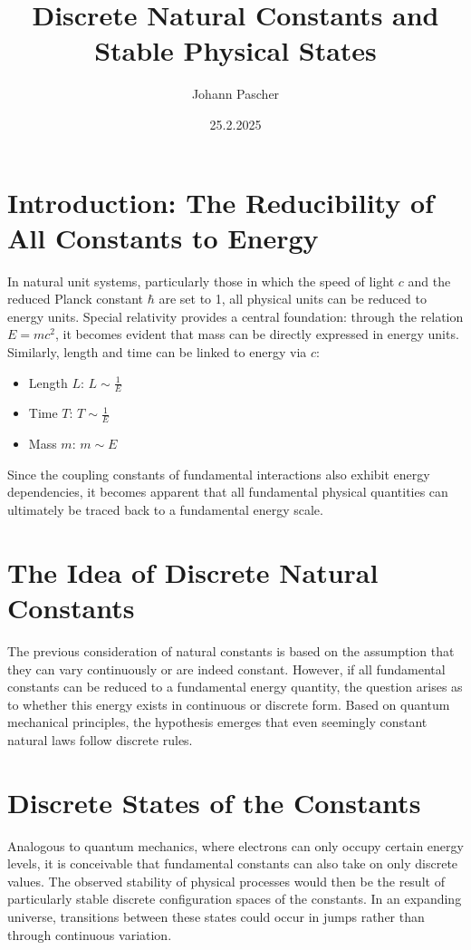 \documentclass{article}
\title{Discrete Natural Constants and Stable Physical States}
\author{Johann Pascher}
\date{25.2.2025}
\begin{document}
	
	\maketitle
	\tableofcontents
	\section{Introduction: The Reducibility of All Constants to Energy}
	
	In natural unit systems, particularly those in which the speed of light \( c \) and the reduced Planck constant \( \hbar \) are set to 1, all physical units can be reduced to energy units. Special relativity provides a central foundation: through the relation \( E = mc^2 \), it becomes evident that mass can be directly expressed in energy units. Similarly, length and time can be linked to energy via \( c \):
	
	\begin{itemize}
		\item Length \( L \): \( L \sim \frac{1}{E} \)
		\item Time \( T \): \( T \sim \frac{1}{E} \)
		\item Mass \( m \): \( m \sim E \)
	\end{itemize}
	
	Since the coupling constants of fundamental interactions also exhibit energy dependencies, it becomes apparent that all fundamental physical quantities can ultimately be traced back to a fundamental energy scale.
	
	\section{The Idea of Discrete Natural Constants}
	
	The previous consideration of natural constants is based on the assumption that they can vary continuously or are indeed constant. However, if all fundamental constants can be reduced to a fundamental energy quantity, the question arises as to whether this energy exists in continuous or discrete form. Based on quantum mechanical principles, the hypothesis emerges that even seemingly constant natural laws follow discrete rules.
	
	\section{Discrete States of the Constants}
	
	Analogous to quantum mechanics, where electrons can only occupy certain energy levels, it is conceivable that fundamental constants can also take on only discrete values. The observed stability of physical processes would then be the result of particularly stable discrete configuration spaces of the constants. In an expanding universe, transitions between these states could occur in jumps rather than through continuous variation.
	
\end{document}
